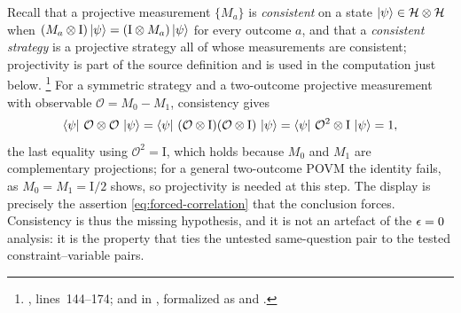 \documentclass[11pt]{article}
\newcommand{\Id}{\mathrm{I}}
\newcommand{\mH}{\mathcal{H}}
\begin{document}
Recall that a projective measurement $\{M_a\}$ is \emph{consistent} on a state
$\ket{\psi} \in \mH \ot \mH$ when
$(M_a \ot \Id)\ket{\psi} = (\Id \ot M_a)\ket{\psi}$ for every outcome $a$, and
that a \emph{consistent strategy} is a projective strategy all of whose
measurements are consistent; projectivity is part of the source definition and
is used in the computation just below.%
\footnote{,
lines~144--174;  and
 in
, formalized as
 and
.}
For a symmetric strategy and a two-outcome projective measurement with
observable $\mathcal O = M_0 - M_1$, consistency gives
\[
  \bra{\psi}\, \mathcal O \ot \mathcal O \,\ket{\psi}
  = \bra{\psi}\, (\mathcal O \ot \Id)(\mathcal O \ot \Id) \,\ket{\psi}
  = \bra{\psi}\, \mathcal O^2 \ot \Id \,\ket{\psi} = 1 ,
\]
the last equality using $\mathcal O^2 = \Id$, which holds because $M_0$ and
$M_1$ are complementary projections; for a general two-outcome POVM the
identity fails, as $M_0 = M_1 = \Id/2$ shows, so projectivity is needed at
this step.  The display is precisely the assertion
\eqref{eq:forced-correlation} that the
conclusion forces.  Consistency is thus the missing hypothesis, and it is not an
artefact of the $\epsilon = 0$ analysis: it is the property that ties the untested
same-question pair to the tested constraint--variable pairs.
\end{document}
